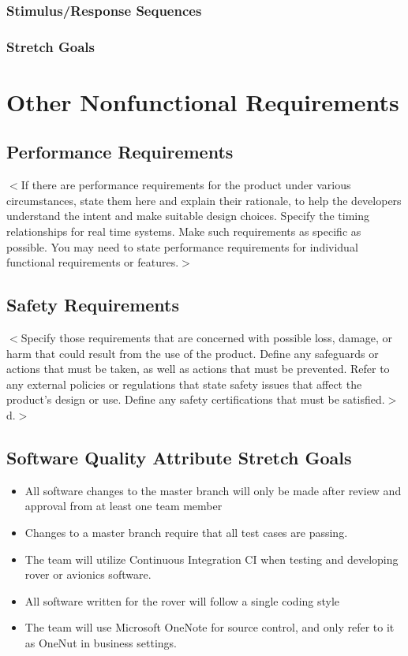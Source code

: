 \documentclass{scrreprt}
\begin{document}
\subsection{Stimulus/Response Sequences}

\subsection{Stretch Goals}




\chapter{Other Nonfunctional Requirements}

\section{Performance Requirements}
$<$If there are performance requirements for the product under various 
circumstances, state them here and explain their rationale, to help the 
developers understand the intent and make suitable design choices. Specify the 
timing relationships for real time systems. Make such requirements as specific 
as possible. You may need to state performance requirements for individual 
functional requirements or features.$>$

\section{Safety Requirements}
$<$Specify those requirements that are concerned with possible loss, damage, or 
harm that could result from the use of the product. Define any safeguards or 
actions that must be taken, as well as actions that must be prevented. Refer to 
any external policies or regulations that state safety issues that affect the 
product’s design or use. Define any safety certifications that must be 
satisfied.$>$
d.$>$

\section{Software Quality Attribute Stretch Goals}
\begin{itemize}
\item All software changes to the master branch will only be made after review and approval from at least one team member
\item Changes to a master branch require that all test cases are passing.
\item The team will utilize Continuous Integration CI when testing and developing rover or avionics software.
\item All software written for the rover will follow a single coding style
\item The team will use Microsoft OneNote for source control, and only refer to it as OneNut in business settings.
\end{itemize}
\end{document}
